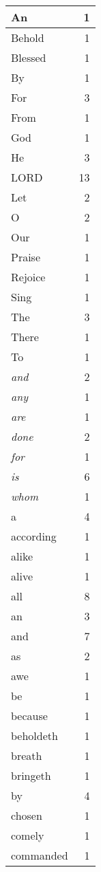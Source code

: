 \begin{center}
\begin{longtable}{l|r}
\hline \hline
\endlastfoot
An & 1 \\ \hline
Behold & 1 \\ \hline
Blessed & 1 \\ \hline
By & 1 \\ \hline
For & 3 \\ \hline
From & 1 \\ \hline
God & 1 \\ \hline
He & 3 \\ \hline
LORD & 13 \\ \hline
Let & 2 \\ \hline
O & 2 \\ \hline
Our & 1 \\ \hline
Praise & 1 \\ \hline
Rejoice & 1 \\ \hline
Sing & 1 \\ \hline
The & 3 \\ \hline
There & 1 \\ \hline
To & 1 \\ \hline
\emph{and} & 2 \\ \hline
\emph{any} & 1 \\ \hline
\emph{are} & 1 \\ \hline
\emph{done} & 2 \\ \hline
\emph{for} & 1 \\ \hline
\emph{is} & 6 \\ \hline
\emph{whom} & 1 \\ \hline
a & 4 \\ \hline
according & 1 \\ \hline
alike & 1 \\ \hline
alive & 1 \\ \hline
all & 8 \\ \hline
an & 3 \\ \hline
and & 7 \\ \hline
as & 2 \\ \hline
awe & 1 \\ \hline
be & 1 \\ \hline
because & 1 \\ \hline
beholdeth & 1 \\ \hline
breath & 1 \\ \hline
bringeth & 1 \\ \hline
by & 4 \\ \hline
chosen & 1 \\ \hline
comely & 1 \\ \hline
commanded & 1 \\ \hline

\end{longtable}
\end{center}
